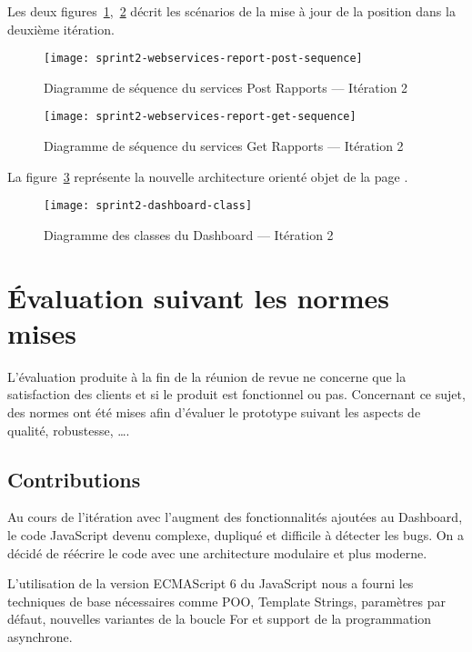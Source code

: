 Les deux
figures~\ref{fig:sprint2-webservices-report-post-sequence},~\ref{fig:sprint2-webservices-report-get-sequence}
décrit les scénarios de la mise à jour de la position dans la deuxième
itération.

\begin{figure}[htbp]
    \centering
    \texttt{[image: sprint2-webservices-report-post-sequence]}
    \caption{Diagramme de séquence du services Post Rapports --- Itération 2}
\label{fig:sprint2-webservices-report-post-sequence}
\end{figure}

\begin{figure}[htbp]
    \centering
    \texttt{[image: sprint2-webservices-report-get-sequence]}
    \caption{Diagramme de séquence du services Get Rapports --- Itération 2}
\label{fig:sprint2-webservices-report-get-sequence}
\end{figure}

La figure~\ref{fig:sprint2-dashboard-class} représente la nouvelle architecture
orienté objet de la page .

\begin{figure}[htbp]
    \centering
    \texttt{[image: sprint2-dashboard-class]}
    \caption{Diagramme des classes du Dashboard --- Itération 2}
\label{fig:sprint2-dashboard-class}
\end{figure}

\section{Évaluation suivant les normes mises}

L'évaluation produite à la fin de la réunion de revue ne concerne que la satisfaction des clients
et si le produit est fonctionnel ou pas. Concernant ce sujet, des normes ont été mises afin d'évaluer
le prototype suivant les aspects de qualité, robustesse, \ldots.

\subsection{Contributions}

Au cours de l'itération avec l'augment des fonctionnalités ajoutées au
Dashboard, le code JavaScript devenu complexe, dupliqué et difficile à détecter
les bugs. On a décidé de réécrire le code avec une architecture modulaire et
plus moderne.

L'utilisation de la version ECMAScript 6 du JavaScript nous a fourni les
techniques de base nécessaires comme POO, Template Strings, paramètres par
défaut, nouvelles variantes de la boucle For et support de la programmation
asynchrone.

